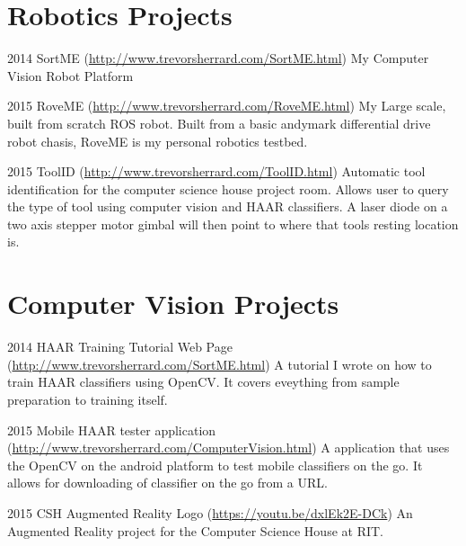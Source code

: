 \documentclass{tccv}
\begin{document}
\section{Robotics Projects}

\begin{yearlist}

\item{2014}
     {SortME (\href{http://www.trevorsherrard.com/SortME.html}{http://www.trevorsherrard.com\newline/SortME.html})}
     {My Computer Vision Robot Platform}
     
\item{2015}
     {RoveME (\href{http://www.trevorsherrard.com/RoveME.html}{http://www.trevorsherrard.com\newline/RoveME.html})}
     {My Large scale, built from scratch ROS robot. Built from a basic andymark differential drive robot chasis, RoveME is my personal robotics testbed.}
     
\item{2015}
	{ToolID (\href{http://www.trevorsherrard.com/ToolID.html}
	{http://www.trevorsherrard.com\newline/ToolID.html})}
	{Automatic tool identification for the computer science house project room. Allows user to query the type of tool using computer vision and HAAR classifiers. A laser diode on a two axis stepper motor gimbal will then point to where that tools resting location is.}

\end{yearlist}


\section{Computer Vision Projects}

\begin{yearlist}

\item{2014}
     {HAAR Training Tutorial Web Page (\href{http://www.trevorsherrard.com/SortME.html}{http://www.trevorsherrard.com\newline/SortME.html})}
     {A tutorial I wrote on how to train HAAR classifiers using OpenCV. It covers eveything from sample preparation to training itself.}
     
\item{2015}
     {Mobile HAAR tester application (\href{http://www.trevorsherrard.com/ComputerVision.html}{http://www.trevorsherrard.com\newline/ComputerVision.html})}
     {A application that uses the OpenCV on the android platform to test mobile classifiers on the go. It allows for downloading of classifier on the go from a URL.}
     
\item{2015}
     {CSH Augmented Reality Logo (\href{https://youtu.be/dxlEk2E-DCk}{https://youtu.be/dxlEk2E-DCk})}
     {An Augmented Reality project for the Computer Science House at RIT. }

\end{yearlist}
\end{document}
